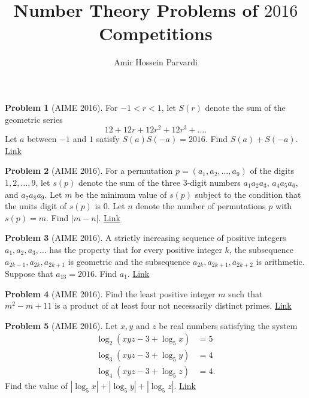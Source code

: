 \documentclass[]{article}
\title{Number Theory Problems of $2016$ Competitions}
\author{Amir Hossein Parvardi}
\theoremstyle{definition}
\newtheorem{problem}{Problem}
\begin{document}
	
\maketitle


\begin{problem}[AIME 2016]
	For $-1 < r < 1$, let $S(r)$ denote the sum of the geometric series \[12 + 12r + 12r^2 + 12r^3 + \ldots.\]Let $a$ between $-1$ and $1$ satisfy $S(a)S(-a)=2016$. Find $S(a) + S(-a)$. \hfill \href{http://artofproblemsolving.com/community/c5h1207186p5966121}{Link}
\end{problem}
	

	
\begin{problem}[AIME 2016]
	For a permutation $p = (a_1,a_2,\ldots,a_9)$ of the digits $1,2,\ldots,9$, let $s(p)$ denote the sum of the three $3$-digit numbers $a_1a_2a_3$, $a_4a_5a_6$, and $a_7a_8a_9$. Let $m$ be the minimum value of $s(p)$ subject to the condition that the units digit of $s(p)$ is $0$. Let $n$ denote the number of permutations $p$ with $s(p) = m$. Find $|m - n|$. \hfill \href{http://artofproblemsolving.com/community/c5h1207194p5966150}{Link}
\end{problem}


	
\begin{problem}[AIME 2016]
	A strictly increasing sequence of positive integers $a_1, a_2, a_3, \ldots$ has the property that for every positive integer $k$, the subsequence $a_{2k-1}, a_{2k}, a_{2k+1}$ is geometric and the subsequence $a_{2k}, a_{2k+1}, a_{2k+2}$ is arithmetic. Suppose that $a_{13} = 2016$. Find $a_1$. \hfill \href{http://artofproblemsolving.com/community/c5h1207204p5966186}{Link}
\end{problem}


	
\begin{problem}[AIME 2016]
	Find the least positive integer $m$ such that $m^2 - m + 11$ is a product of at least four not necessarily distinct primes. \hfill \href{http://artofproblemsolving.com/community/c5h1207207p5966196}{Link}
\end{problem}


	
\begin{problem}[AIME 2016]
	Let $x,y$ and $z$ be real numbers satisfying the system \begin{align*} \log_2(xyz-3+\log_5 x) &= 5 \\ \log_3(xyz-3+\log_5 y) &= 4 \\ \log_4(xyz-3+\log_5 z) &= 4. \end{align*}Find the value of $|\log_5 x|+|\log_5 y|+|\log_5 z|$. \hfill \href{http://artofproblemsolving.com/community/c5h1213121p6023524}{Link}
\end{problem}
\end{document}
